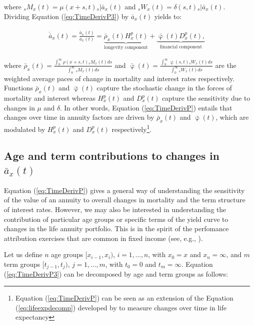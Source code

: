 \documentclass[12pt]{article}
\begin{document}
where ${}_sM_x(t)= \mu(x+s,t){}_s|\bar{a}_x(t)$ and ${}_sW_x(t)=\delta(s,t)  {}_s|\bar{a}_x(t)$. Dividing Equation (\ref{eq:TimeDerivP3}) by $\bar{a}_x(t)$ yields to:


\begin{equation}\label{eq:TimeDerivP}
\begin{split}
 \acute{\bar{a}}_x(t) = \frac{\dot{\bar{a}}_x(t)}{\bar{a}_x(t)}  = 
 \underbrace{\bar{\rho}_x(t){H}^{p}_x(t)}_\text{longevity component}
 +\underbrace{\bar{\upvarphi}(t){D}^{p}_x(t),}_\text{financial component}
\end{split}
\end{equation}

where $\bar{\rho}_x(t)= \frac{\int_0^\infty \rho(x+s,t) {}_sM_x(t)  ds}{\int_0^\infty  {}_sM_x(t)ds}$ and 
$\bar{\upvarphi}(t)= \frac{\int_0^\infty \upvarphi(s,t) {}_sW_x(t)  ds}{\int_0^\infty {}_sW_x(t) ds}$ are the weighted average paces of change in mortality and interest rates respectively. Functions $\bar{\rho}_x(t)$ and $\bar{\upvarphi}(t)$ capture the stochastic change in the forces of mortality and interest whereas ${H}^{p}_x(t)$ and ${D}^{p}_x(t)$ capture the sensitivity due to changes in $\mu$ and $\delta$. In other words, Equation (\ref{eq:TimeDerivP}) entails that changes over time in annuity factors are driven by $\bar{\rho}_x(t)$ and $\bar{\upvarphi}(t)$, which are modulated by ${H}^{p}_x(t)$ and ${D}^{p}_x(t)$ respectively\footnote{Equation (\ref{eq:TimeDerivP}) can be seen as an extension of the Equation (\ref{eq:lifeexpdecomp}) developed by \citet{Vaupel2003} to measure changes over time in life expectancy}.


\subsection{Age and term contributions to changes in $\bar{a}_x(t)$}

Equation (\ref{eq:TimeDerivP}) gives a general way of understanding the sensitivity of the value of an annuity to overall changes in mortality and the term structure of interest rates. However, we may also be interested in understanding the contribution of particular age groups or specific terms of the yield curve to changes in the life annuity portfolio. This is in the spirit of the perfomance attribution exercises that are common in fixed income (see, e.g., \citet{Daul2012}).

 Let us define $n$ age groups $[x_{i-1}, x_i)$, $i=1,\ldots,n$, with $x_0=x$ and $x_n=\infty$, and $m$ term groups $[t_{j-1}, t_j)$, $j=1,\ldots,m$, with $t_0=0$ and $t_m=\infty$. Equation (\ref{eq:TimeDerivP3}) can be decomposed by age and term groups as follows:
\end{document}
